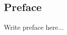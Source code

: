 \begin{center}
\section*{\Huge Preface}
\vspace*{0.7cm}
\end{center}

\noindent Write preface here...


\cleardoublepage